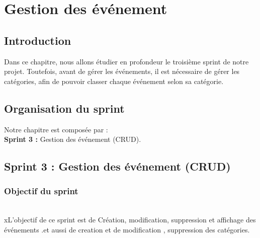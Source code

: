 \chapter{Gestion des événement   }

\section*{Introduction}
Dans ce chapitre, nous allons étudier en profondeur le troisième sprint de notre projet. Toutefois, avant de gérer les événements, il est nécessaire de gérer les catégories, afin de pouvoir classer chaque événement selon sa catégorie.
\section{Organisation du sprint}
Notre chapitre est composée par :\\
\textbf{Sprint 3 :} Gestion des événement (CRUD).
\section{Sprint 3 : Gestion des événement (CRUD)}
\subsection{Objectif du sprint}\\
xL'objectif de ce sprint est de Création, modification, suppression et affichage des événements .et aussi de creation et de modification , suppression des catégories.

